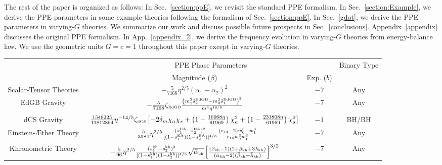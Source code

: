 \documentclass[prd,twocolumn,nofootinbib]{revtex4-1}
\newcommand{\EDGB}{{\mbox{\tiny EdGB}}}
\newcommand{\KG}{{\mbox{\tiny kh}}}
\newcommand{\EA}{{\mbox{\tiny EA}}}
\newcommand{\DCS}{{\mbox{\tiny dCS}}}
\begin{document}
The rest of the paper is organized as follows: In Sec.~\ref{section:ppE}, we revisit the standard PPE formalism. In Sec.~\ref{section:Example}, we derive the PPE parameters in some example theories following the formalism of Sec.~\ref{section:ppE}. In Sec.~\ref{gdot}, we derive the PPE parameters in varying-$G$ theories. We summarize our work and discuss possible future prospects in Sec.~\ref{conclusions}. Appendix~\ref{appendix} discusses the original PPE formalism. In App.~\ref{appendix_2}, we derive the frequency evolution in varying-$G$ theories from energy-balance law. We use the geometric units $G=c=1$ throughout this paper except in varying-$G$ theories. 
{
\newcommand{\minitab}[2][l]{\begin{tabular}{#1}#2\end{tabular}}
\renewcommand{\arraystretch}{2.}
\begingroup 
\begin{table*}[htb]
\begin{centering}
\begin{tabular}{c|c|c|c}
\hline
\hline
\noalign{\smallskip}
\multirow{2}{*}{Theories}&\multicolumn{2}{c|}{PPE Phase Parameters} & \multirow{2}{*}{Binary Type}\\ \cline{2-3}
& Magnitude ($\beta$)   & Exp. ($b$) &  \\ \hline
Scalar-Tensor Theories~\cite{Scharre:2001hn,Berti:2004bd}&$-\frac{5}{7168}\eta ^{2/5}(\alpha_1-\alpha_2)^2$& $-7$ & Any\\ \hline
EdGB Gravity~\cite{Yagi:2011xp}&$-\frac{5}{7168}\zeta_\EDGB\frac{\left(m_1^2\tilde s_2^\EDGB-m_2^2\tilde s_1^\EDGB\right)^2}{m^4\eta^{18/5}}$&$-7$ & Any\\ \hline
dCS Gravity~\cite{Yagi:2012vf,Yunes:2016jcc}&$\frac{1549225}{11812864}\eta ^{-14/5} \zeta_{\DCS} \left[-2 \delta_m \chi_a \chi_s+\left(1-\frac{16068 \eta }{61969}\right)\chi_a^2 +\left(1-\frac{231808 \eta }{61969}\right)\chi_s^2\right]
$&$-1$ & BH/BH\\ \hline
Einstein-\AE ther Theory~\cite{Hansen:2014ewa}& $-\frac{5}{3584}\eta ^{2/5} \frac{(s_1^\EA-s_2^\EA)^2}{[(1-s_1^\EA) (1-s_2^\EA)]^{4/3}} \frac{(c_{14}-2) w_0^3-w_1^3}{c_{14} w_0^3 w_1^3}$  & $-7$ & Any\\ \hline
Khronometric Theory~\cite{Hansen:2014ewa}&$-\frac{5}{96} \eta ^{2/5}\frac{(s_1^\KG-s_2^\KG)^2}{[(1-s_1^\KG) (1-s_2^\KG)]^{4/3}}  \sqrt{\bar \alpha_{\KG}}\left[\frac{(\bar \beta_{\KG}-1)(2+\bar \beta_{\KG}+3\bar \lambda_{\KG})}{(\bar \alpha_{\KG}-2)(\bar \beta_{\KG}+\bar \lambda_{\KG})}\right]^{3/2}$&$-7$ & Any\\ \hline 

\end{tabular}
\end{centering}
\end{table*}}
\end{document}
